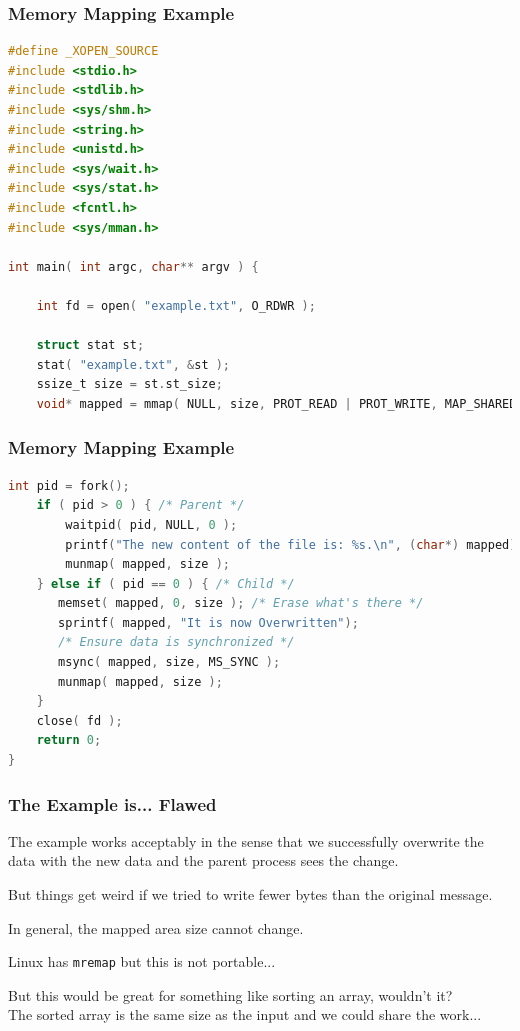 \begin{frame}[fragile]
	\frametitle{Memory Mapping Example}

	\begin{lstlisting}[language=C]
#define _XOPEN_SOURCE
#include <stdio.h>
#include <stdlib.h>
#include <sys/shm.h>
#include <string.h>
#include <unistd.h>
#include <sys/wait.h>
#include <sys/stat.h>
#include <fcntl.h>
#include <sys/mman.h>

int main( int argc, char** argv ) { 

    int fd = open( "example.txt", O_RDWR );
    
    struct stat st; 
    stat( "example.txt", &st );
    ssize_t size = st.st_size;
    void* mapped = mmap( NULL, size, PROT_READ | PROT_WRITE, MAP_SHARED, fd, 0 );  
\end{lstlisting}
\end{frame}

\begin{frame}[fragile]
	\frametitle{Memory Mapping Example}

	\begin{lstlisting}[language=C]
    int pid = fork();
    if ( pid > 0 ) { /* Parent */
        waitpid( pid, NULL, 0 );
        printf("The new content of the file is: %s.\n", (char*) mapped);
        munmap( mapped, size );
    } else if ( pid == 0 ) { /* Child */
       memset( mapped, 0, size ); /* Erase what's there */
       sprintf( mapped, "It is now Overwritten");
       /* Ensure data is synchronized */
       msync( mapped, size, MS_SYNC );
       munmap( mapped, size );
    }
    close( fd );
    return 0;
}
\end{lstlisting}

\end{frame}

\begin{frame}
	\frametitle{The Example is... Flawed}

	The example works acceptably in the sense that we successfully overwrite the data with the new data and the parent process sees the change.

	But things get weird if we tried to write fewer bytes than the original message.

	In general, the mapped area size cannot change.

	Linux has \texttt{mremap} but this is not portable...

	But this would be great for something like sorting an array, wouldn't it?\\
	\quad The sorted array is the same size as the input and we could share the work...

\end{frame}







